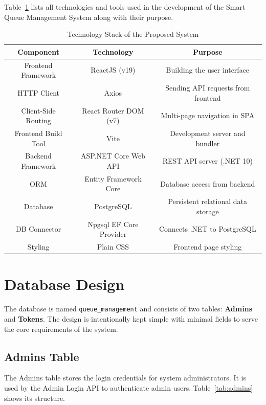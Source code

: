Table~\ref{tab:techstack} lists all technologies and tools used in the development of the Smart Queue Management System along with their purpose.

\begin{table}[htbp]
    \centering
    \begin{tabular}{|c|c|c|}
        \hline
        \textbf{Component} & \textbf{Technology} & \textbf{Purpose} \\
        \hline
        Frontend Framework & ReactJS (v19) & Building the user interface \\
        \hline
        HTTP Client & Axios & Sending API requests from frontend \\
        \hline
        Client-Side Routing & React Router DOM (v7) & Multi-page navigation in SPA \\
        \hline
        Frontend Build Tool & Vite & Development server and bundler \\
        \hline
        Backend Framework & ASP.NET Core Web API & REST API server (.NET 10) \\
        \hline
        ORM & Entity Framework Core & Database access from backend \\
        \hline
        Database & PostgreSQL & Persistent relational data storage \\
        \hline
        DB Connector & Npgsql EF Core Provider & Connects .NET to PostgreSQL \\
        \hline
        Styling & Plain CSS & Frontend page styling \\
        \hline
    \end{tabular}
    \caption{Technology Stack of the Proposed System}
    \label{tab:techstack}
\end{table}

\section{Database Design}

The database is named \texttt{queue\_management} and consists of two tables: \textbf{Admins} and \textbf{Tokens}. The design is intentionally kept simple with minimal fields to serve the core requirements of the system.

\subsection{Admins Table}

The Admins table stores the login credentials for system administrators. It is used by the Admin Login API to authenticate admin users. Table~\ref{tab:admins} shows its structure.

